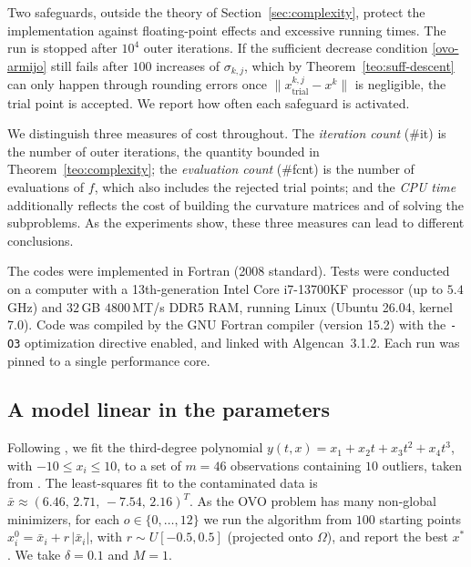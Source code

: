 \documentclass[11pt]{article}
\newcounter{alg}[section]
\begin{document}
Two safeguards, outside the theory of Section~\ref{sec:complexity}, protect the
implementation against floating-point effects and excessive running times. The
run is stopped after $10^4$ outer iterations. If the sufficient decrease
condition \eqref{ovo-armijo} still fails after $100$ increases of
$\sigma_{k,j}$, which by Theorem~\ref{teo:suff-descent} can only happen through
rounding errors once $\|x^{k,j}_{\mathrm{trial}} - x^k\|$ is negligible, the
trial point is accepted. We report how often each safeguard is activated.

We distinguish three measures of cost throughout. The \emph{iteration count}
(\#it) is the number of outer iterations, the quantity bounded in
Theorem~\ref{teo:complexity}; the \emph{evaluation count} (\#fcnt) is the
number of evaluations of $f$, which also includes the rejected trial points;
and the \emph{CPU time} additionally reflects the cost of building the
curvature matrices and of solving the subproblems. As the experiments show,
these three measures can lead to different conclusions.

The codes were implemented in Fortran (2008 standard). Tests were conducted on a computer
with a 13th-generation Intel Core i7-13700KF processor (up to $5.4$\,GHz) and
$32$\,GB $4800$\,MT/s DDR5 RAM,
running Linux (Ubuntu 26.04, kernel 7.0). Code was compiled by the GNU Fortran
compiler (version 15.2) with the \texttt{-O3} optimization directive enabled,
and linked with Algencan~3.1.2.
Each run was pinned to a single performance core.

\subsection{A model linear in the parameters} \label{subsec:poly}

Following \cite{dunder1}, we fit the third-degree polynomial
$y(t,x)=x_1+x_2t+x_3t^2+x_4t^3$, with $-10\le x_i\le10$, to a set of $m=46$
observations containing $10$ outliers, taken from \cite{dunder1}. The
least-squares fit to the contaminated data is
$\bar x\approx(6.46,\,2.71,\,-7.54,\,2.16)^T$. As the OVO problem has many
non-global minimizers, for each $o\in\{0,\dots,12\}$ we run the algorithm from
$100$ starting points $x^0_i=\bar x_i+r\,|\bar x_i|$, with $r\sim U[-0.5,0.5]$
(projected onto $\Omega$), and report the best $x^*$. We take $\delta=0.1$ and
$M=1$.
\end{document}
